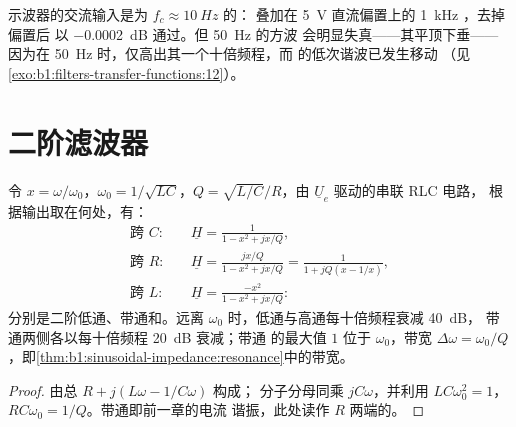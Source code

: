 \begin{example}[交流耦合]\label{ex:b1:filters-transfer-functions:accoupling}
示波器的交流输入是为 $f_c \approx \qty{10}{Hz}$ 的：
叠加在 \qty{5}{V} 直流偏置上的 \qty{1}{kHz} ，去掉偏置后
以 \qty{-0.0002}{dB} 通过。但 \qty{50}{Hz} 的方波
会明显失真——其平顶下垂——因为在
\qty{50}{Hz} 时，仅高出其一个十倍频程，而
的低次谐波已发生移动
（见\cref{exo:b1:filters-transfer-functions:12}）。
\end{example}

\section{二阶滤波器}

\begin{proposition}\label{prop:b1:filters-transfer-functions:rlc}
令 $x = \omega/\omega_0$，$\omega_0 = 1/\sqrt{LC}$，$Q =
\sqrt{L/C}/R$，由 $\underline U_e$ 驱动的串联 RLC 电路，
根据输出取在何处，有：
\begin{align*}
\text{跨 } C:&\quad \underline H = \frac{1}{1 - x^2 + jx/Q}, \\
\text{跨 } R:&\quad \underline H = \frac{jx/Q}{1 - x^2 + jx/Q} = \frac{1}{1 + jQ(x - 1/x)}, \\
\text{跨 } L:&\quad \underline H = \frac{-x^2}{1 - x^2 + jx/Q}:
\end{align*}
分别是二阶低通、带通和。远离
$\omega_0$ 时，低通与高通每十倍频程衰减 \qty{40}{dB}，
带通两侧各以每十倍频程 \qty{20}{dB} 衰减；带通
的最大值 $1$ 位于 $\omega_0$，带宽 $\Delta\omega =
\omega_0/Q$，即\cref{thm:b1:sinusoidal-impedance:resonance}中的带宽。
\end{proposition}

\begin{proof}
由总 $R + j(L\omega - 1/C\omega)$ 构成；
分子分母同乘 $jC\omega$，并利用
$LC\omega_0^2 = 1$，$RC\omega_0 = 1/Q$。带通即前一章的电流
谐振，此处读作 $R$ 两端的。
\end{proof}

